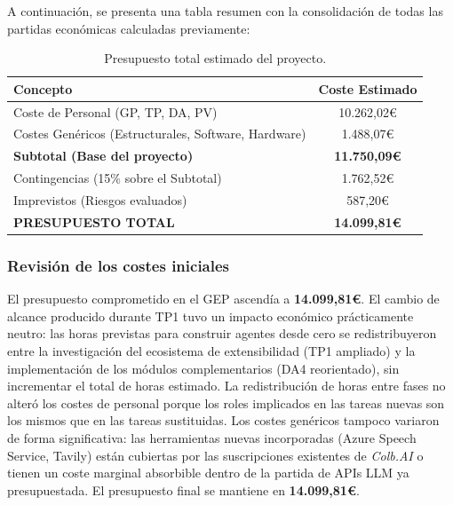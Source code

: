 \documentclass[11pt, letterpaper]{article}
\begin{document}
A continuación, se presenta una tabla resumen con la consolidación de todas las partidas económicas calculadas previamente:

\begin{table}[H]
    \centering
    \begin{tabular}{l c}
         \toprule
         \textbf{Concepto} & \textbf{Coste Estimado} \\
         \midrule
         Coste de Personal (GP, TP, DA, PV) & 10.262,02€ \\
         Costes Genéricos (Estructurales, Software, Hardware) & 1.488,07€ \\
         \midrule
         \textbf{Subtotal (Base del proyecto)} & \textbf{11.750,09€} \\
         \midrule
         Contingencias (15\% sobre el Subtotal) & 1.762,52€ \\
         Imprevistos (Riesgos evaluados) & 587,20€ \\
         \midrule
         \textbf{PRESUPUESTO TOTAL} & \textbf{14.099,81€} \\
         \bottomrule
    \end{tabular}
    \caption{Presupuesto total estimado del proyecto.}
    \label{tab:coste_total}
\end{table}

\subsubsection{Revisión de los costes iniciales}
\label{sec:revision_costes}

El presupuesto comprometido en el GEP ascendía a \textbf{14.099,81€}. El cambio de alcance producido durante TP1 tuvo un impacto económico prácticamente neutro: las horas previstas para construir agentes desde cero se redistribuyeron entre la investigación del ecosistema de extensibilidad (TP1 ampliado) y la implementación de los módulos complementarios (DA4 reorientado), sin incrementar el total de horas estimado. La redistribución de horas entre fases no alteró los costes de personal porque los roles implicados en las tareas nuevas son los mismos que en las tareas sustituidas. Los costes genéricos tampoco variaron de forma significativa: las herramientas nuevas incorporadas (Azure Speech Service, Tavily) están cubiertas por las suscripciones existentes de \textit{Colb.AI} o tienen un coste marginal absorbible dentro de la partida de APIs LLM ya presupuestada. El presupuesto final se mantiene en \textbf{14.099,81€}.
\end{document}
